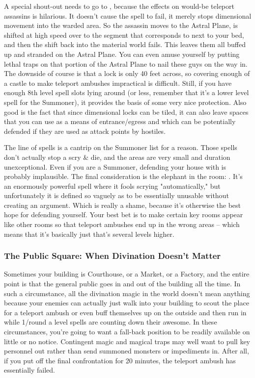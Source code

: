 A special shout-out needs to go to , because the effects on would-be teleport assassins is hilarious. It doesn't cause the spell to fail, it merely stops dimensional movement into the warded area. So the assassin moves to the Astral Plane, is shifted at high speed over to the segment that corresponds to next to your bed, and then the shift back into the material world fails. This leaves them all buffed up and stranded on the Astral Plane. You can even amuse yourself by putting lethal traps on that portion of the Astral Plane to nail these guys on the way in. The downside of course is that a lock is only 40 feet across, so covering enough of a castle to make teleport ambushes impractical is difficult. Still, if you have enough 8th level spell slots lying around (or less, remember that it's a lower level spell for the Summoner), it provides the basis of some very nice protection. Also good is the fact that since dimensional locks can be tiled, it can also leave spaces that you can use as a means of entrance/egress and which can be potentially defended if they are used as attack points by hostiles.

The  line of spells is a cantrip on the Summoner list for a reason. Those spells don't actually stop a scry \& die, and the areas are very small and duration unexceptional. Even if you are a Summoner, defending your house with  is probably implausible. The final consideration is the elephant in the room: . It's an enormously powerful spell where it fools scrying "automatically," but unfortunately it is defined so vaguely as to be essentially unusable without creating an argument. Which is really a shame, because it's otherwise the best hope for defending yourself. Your best bet is to make certain key rooms appear like other rooms so that teleport ambushes end up in the wrong areas -- which means that it's basically just  that's several levels higher.

\subsubsection{The Public Square: When Divination Doesn't Matter}

Sometimes your building is Courthouse, or a Market, or a Factory, and the entire point is that the general public goes in and out of the building all the time. In such a circumstance, all the divination magic in the world doesn't mean anything because your enemies can actually just walk into your building to scout the place for a teleport ambush or even buff themselves up on the outside and then run in while 1/round a level spells are counting down their awesome. In these circumstances, you're going to want a fall-back position to be readily available on little or no notice. Contingent magic and magical traps may well want to pull key personnel out rather than send summoned monsters or impediments in. After all, if you put off the final confrontation for 20 minutes, the teleport ambush has essentially failed.


